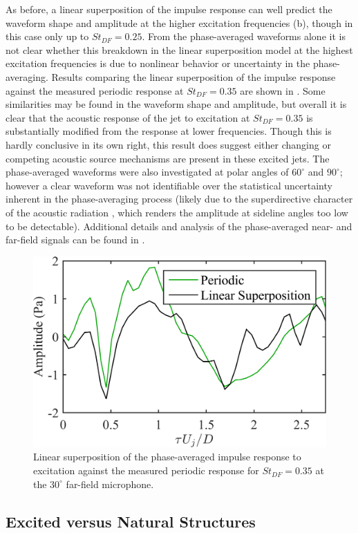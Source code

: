 As before, a linear superposition of the impulse response can well predict the waveform shape and amplitude at the higher excitation frequencies (b), though in this case only up to $St_{DF}  = 0.25$. 
From the phase-averaged waveforms alone it is not clear whether this breakdown in the linear superposition model at the highest excitation frequencies is due to nonlinear behavior or uncertainty in the phase-averaging. 
Results comparing the linear superposition of the impulse response against the measured periodic response at $St_{DF}  = 0.35$ are shown in .
Some similarities may be found in the waveform shape and amplitude, but overall it is clear that the acoustic response of the jet to excitation at $St_{DF}  = 0.35$ is substantially modified from the response at lower frequencies.
Though this is hardly conclusive in its own right, this result does suggest either changing or competing acoustic source mechanisms are present in these excited jets.
The phase-averaged waveforms were also investigated at polar angles of $60^\circ$ and $90^\circ$; however a clear waveform was not identifiable over the statistical uncertainty inherent in the phase-averaging process (likely due to the superdirective character of the acoustic radiation \citep{Crighton1990}, which renders the amplitude at sideline angles too low to be detectable).
Additional details and analysis of the phase-averaged near- and far-field signals can be found in \citet{Crawley2015}.
\begin{figure}
	\centering
	\includegraphics[width=0.45\linewidth]{Figures/ch3_farfield_linearsuperposition_st035_v2.png}
	\caption{Linear superposition of the phase-averaged impulse response to excitation against the measured periodic response for $St_{DF} = 0.35$ at the  $30^\circ$ far-field microphone.}
	\label{fig:ch3_farfield_nonlinear}
\end{figure}

\subsection{Excited versus Natural Structures}



